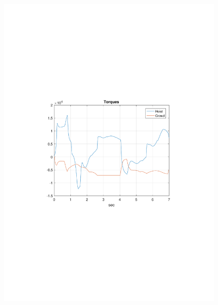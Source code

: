 \documentclass[table]{beamer}
\begin{document}
\begin{frame}[c]
\begin{columns}[c]
\begin{figure}
			\includegraphics[trim=4cm 9cm 4cm 9.5cm, clip=true, width=\linewidth]{img/Example3_Torques}
			\vskip 0mm

\end{figure}
\end{columns}
\end{frame}
\end{document}
